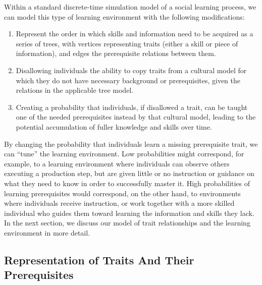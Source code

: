 Within a standard discrete-time simulation model of a social learning
process, we can model this type of learning environment with the
following modifications:

\begin{enumerate}
\def\labelenumi{\arabic{enumi}.}
\itemsep1pt\parskip0pt
\item
  Represent the order in which skills and information need to be
  acquired as a series of trees, with vertices representing traits
  (either a skill or piece of information), and edges the prerequisite
  relations between them.
\item
  Disallowing individuals the ability to copy traits from a cultural
  model for which they do not have necessary background or
  prerequisites, given the relations in the applicable tree model.
\item
  Creating a probability that individuals, if disallowed a trait, can be
  taught one of the needed prerequisites instead by that cultural model,
  leading to the potential accumulation of fuller knowledge and skills
  over time.
\end{enumerate}

By changing the probability that individuals learn a missing
prerequisite trait, we can ``tune'' the learning environment. Low
probabilities might correspond, for example, to a learning environment
where individuals can observe others executing a production step, but
are given little or no instruction or guidance on what they need to know
in order to successfully master it. High probabilities of learning
prerequisites would correspond, on the other hand, to environments where
individuals receive instruction, or work together with a more skilled
individual who guides them toward learning the information and skills
they lack. In the next section, we discuss our model of trait
relationships and the learning environment in more detail.

\subsection{Representation of Traits And Their
Prerequisites}\label{representation-of-traits-and-their-prerequisites}

